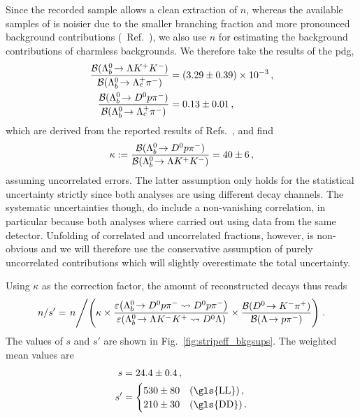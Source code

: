 Since the recorded \decay{\Lb}{\Dz\proton\pim} sample allows a clean extraction of $n$, whereas the available samples of \decay{\Lb}{\Lz\Kp\Km} is noisier due to the smaller branching fraction and more pronounced background contributions (\cf{}~Ref.~\cite{LbToLzhh}), we also use $n$ for estimating the background contributions of charmless backgrounds.
We therefore take the results of the \gls{pdg},
\begin{align*}
    \frac{{\mathcal{B}}({{\Lambda}^0_{b}}\!\rightarrow {\ensuremath{\Lambda}}{\ensuremath{{K}^+}}{\ensuremath{{K}^-}})}{{\mathcal{B}}({{\Lambda}^0_{b}}\!\rightarrow {\ensuremath{{\Lambda}^+_{c}}}{\ensuremath{{\pi}^-}})} &= (3.29 \pm 0.39) \times 10^{-3} \,, \\
    \frac{{\mathcal{B}}({{\Lambda}^0_{b}}\!\rightarrow {\ensuremath{{D}^0}}{\ensuremath{p}}{\ensuremath{{\pi}^-}})}{{\mathcal{B}}({{\Lambda}^0_{b}}\!\rightarrow {\ensuremath{{\Lambda}^+_{c}}}{\ensuremath{{\pi}^-}})} &= 0.13 \pm 0.01 \,,
\end{align*}
which are derived from the reported results of Refs.~\cite{LbToLzhh,LbToDzphAndLch}, and find
\begin{equation*}
    \kappa := \frac{{\mathcal{B}}({{\Lambda}^0_{b}}\!\rightarrow {\ensuremath{{D}^0}}{\ensuremath{p}}{\ensuremath{{\pi}^-}})}{{\mathcal{B}}({{\Lambda}^0_{b}}\!\rightarrow {\ensuremath{\Lambda}}{\ensuremath{{K}^+}}{\ensuremath{{K}^-}})} = 40 \pm 6 \,,
\end{equation*}
assuming uncorrelated errors.
The latter assumption only holds for the statistical uncertainty strictly since both analyses are using different decay channels.
The systematic uncertainties though, do include a non-vanishing correlation, in particular because both analyses where carried out using data from the same detector.
Unfolding of correlated and uncorrelated fractions, however, is non-obvious and we will therefore use the conservative assumption of purely uncorrelated contributions which will slightly overestimate the total uncertainty.

Using $\kappa$ as the correction factor, the amount of reconstructed \decay{\Lb}{\Lz\Km\Kp} decays thus reads
\begin{equation*}
    n / s' = \left. n \middle/ \left( \kappa \times \frac{\varepsilon\!\left( {{\Lambda}^0_{b}}\!\rightarrow {\ensuremath{{D}^0}}{\ensuremath{p}}{\ensuremath{{\pi}^-}} \rightsquigarrow {\ensuremath{{D}^0}}{\ensuremath{p}}{\ensuremath{{\pi}^-}} \right)}{\varepsilon\!\left( {{\Lambda}^0_{b}}\!\rightarrow {\ensuremath{\Lambda}}{\ensuremath{{K}^-}}{\ensuremath{{K}^+}} \rightsquigarrow {\ensuremath{{D}^0}}{\ensuremath{\Lambda}} \right)} \times \frac{{\mathcal{B}}({{D}^0}\!\rightarrow {\ensuremath{{K}^-}}{\ensuremath{{\pi}^+}})}{{\mathcal{B}}({\Lambda}\!\rightarrow {\ensuremath{p}}{\ensuremath{{\pi}^-}})} \right) \right..
\end{equation*}
The values of $s$ and $s'$ are shown in Fig.~\ref{fig:stripeff_bkgsups}.
The weighted mean values are
\begin{subequations}
\label{eq:strip_effs_supfac}
\begin{align}
    s &= \num{24.4 \pm 0.4} \,, \\
    s' &= \begin{cases}
        \num{530 \pm 80} & \text{(\gls{LL})} \,, \\
        \num{210 \pm 30} & \text{(\gls{DD})} \,.
    \end{cases}
\end{align}
\end{subequations}

